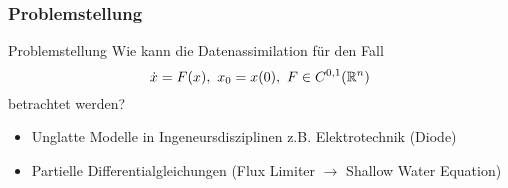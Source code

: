 \begin{frame}[<+->]
  \frametitle{Problemstellung}
  \begin{block}{Problemstellung}
  \centering
	Wie kann die Datenassimilation für den Fall
	\[
	  \dot{x} = F(x),~ x_0 = x(0),~F\in C^{0,1}(\mathbb R^n)
	\]
	betrachtet werden?
  \end{block}
   \begin{itemize}
    \item Unglatte Modelle in Ingeneursdisziplinen z.B. Elektrotechnik (Diode)
    \item Partielle Differentialgleichungen (Flux Limiter $\to$ Shallow Water Equation)
   \end{itemize}


\end{frame} 
